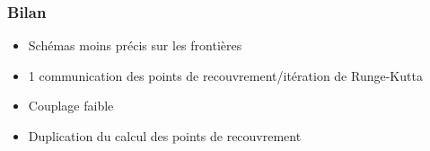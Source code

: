 \documentclass{beamer}
\begin{document}
\begin{frame}
\end{frame}


\begin{frame}
  \frametitle{Bilan}
  \begin{itemize}
  \item Schémas moins précis sur les frontières
  \item 1 communication des points de recouvrement/itération de Runge-Kutta
  \item Couplage faible
  \item Duplication du calcul des points de recouvrement
  \end{itemize}
\end{frame}
\end{document}
